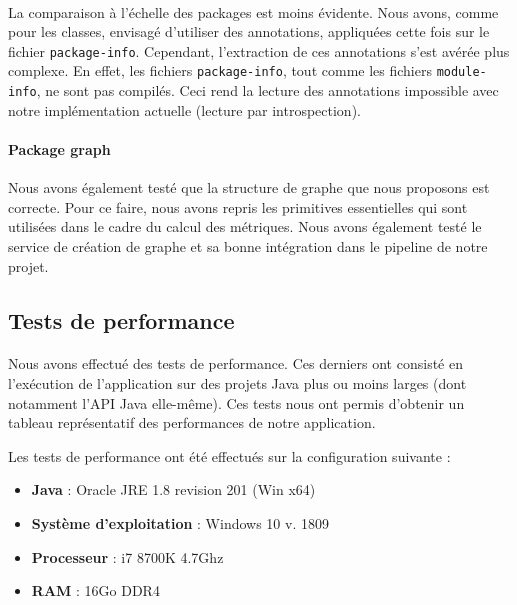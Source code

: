 \documentclass{scrartcl}
\begin{document}
    \paragraph{}La comparaison à l'échelle des packages est moins évidente. Nous avons, comme pour les classes, envisagé d'utiliser des annotations, appliquées cette fois sur le fichier \texttt{package-info}. Cependant, l'extraction de ces annotations s'est avérée plus complexe. En effet, les fichiers \texttt{package-info}, tout comme les fichiers \texttt{module-info}, ne sont pas compilés. Ceci rend la lecture des annotations impossible avec notre implémentation actuelle (lecture par introspection).
    
    \paragraph{Package graph}Nous avons également testé que la structure de graphe que nous proposons est correcte. Pour ce faire, nous avons repris les primitives essentielles qui sont utilisées dans le cadre du calcul des métriques. Nous avons également testé le service de création de graphe et sa bonne intégration dans le pipeline de notre projet.
    
\subsection{Tests de performance}

    \paragraph{}Nous avons effectué des tests de performance. Ces derniers ont consisté en l’exécution de l’application sur des projets Java plus ou moins larges (dont notamment l'API Java elle-même). Ces tests nous ont permis d’obtenir un tableau représentatif des performances de notre application.
    
    Les tests de performance ont été effectués sur la configuration suivante :
    \begin{itemize}
        \item \textbf{Java} : Oracle JRE 1.8 revision 201 (Win x64)
        \item \textbf{Système d'exploitation} : Windows 10 v. 1809
        \item \textbf{Processeur} : i7 8700K 4.7Ghz
        \item \textbf{RAM} : 16Go DDR4
    \end{itemize}
    
\end{document}
